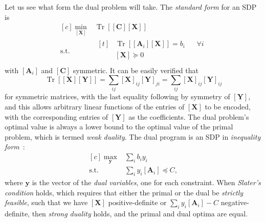 \documentclass[10pt, a4paper]{article}
\numberwithin{equation}{section} %
\theoremstyle{definition}
\theoremstyle{plain}
\newcommand{\?}{\mathrel{?}} %
\newcommand{\cvec}[1]{\boldsymbol{\mathbf{#1}}}    %
\newcommand{\matr}[2][]{\left[\mathbf{#2}#1\right]} %
\newcommand{\Tr}[2][]{\mathop{\mathrm{Tr}#1}\left[ #2 \right]} %
\begin{document}
                  Let us see what form the dual problem will take. The \emph{standard form} for an SDP is~\cite[Ch. 4.6.2]{BoydVand}
                  \begin{equation}
                    \begin{aligned}[c]
                      \min_{\matr{X}} & \Tr{ \matr{C}\matr{X} } \\
                      \text{s.t.} & \begin{aligned}[t]
                                  & \Tr{ \matr[_i]{A} \matr{X} } = b_i & & \forall i \\
                                  & \matr{X} \succeq 0 & & \\
                      \end{aligned}
                      \end{aligned}
                    \end{equation}
                    with \(\matr[_i]{A}\) and \(\matr{C}\) symmetric. It can be easily verified that
                    \begin{equation}
                      \Tr{\matr{X}\matr{Y}} = \sum_{ij} \matr{X}_{ij} \matr{Y}_{ji} = \sum_{ij} \matr{X}_{ij} \matr{Y}_{ij}
                    \end{equation}
                    for symmetric matrices, with the last equality following by symmetry of \(\matr{Y}\), and this allows arbitrary linear functions of the entries of \(\matr{X}\) to be encoded, with the corresponding entries of \(\matr{Y}\) as the coefficients. The dual problem's optimal value is always a lower bound to the optimal value of the primal problem, which is termed \emph{weak duality}. The dual program is an SDP in \emph{inequality form}~\cite[Ch. 5.9]{BoydVand}:
                    \begin{equation}
                      \begin{aligned}[c]
                        \max_{\cvec{y}} & \sum_{i} b_i y_i \\
                        \text{s.t.} & \sum_{i} y_i \matr[_i]{A} \preceq C,
                      \end{aligned}
                    \end{equation}
                    where \(\cvec{y}\) is the vector of the \emph{dual variables}, one for each constraint. When \emph{Slater's condition} holds, which requires that either the primal or the dual be \emph{strictly feasible}, such that we have \(\matr{X}\) positive-definite or \(\sum_{i} y_i \matr[_i]{A} - C\) negative-definite, then \emph{strong duality} holds, and the primal and dual optima are equal.
\end{document}
